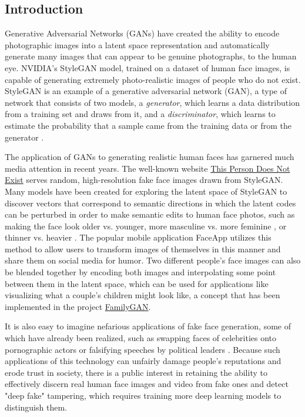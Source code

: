 \documentclass[11pt, letterpaper]{article}
\begin{document}
\begin{multicols}{2}
  \section{Introduction}

  Generative Adversarial Networks (GANs) have created the ability to encode
  photographic images into a latent space representation and automatically
  generate many images that can appear to be genuine photographs, to the human
  eye. NVIDIA's StyleGAN\cite{stylegan} model, trained on a dataset of human
  face images, is capable of generating extremely photo-realistic images of
  people who do not exist. StyleGAN is an example of a generative adversarial
  network (GAN), a type of network that consists of two models, a
  \emph{generator}, which learns a data distribution from a training set and
  draws from it, and a \emph{discriminator}, which learns to estimate the
  probability that a sample came from the training data or from the generator
  \cite{goodfellow2014generative}.

  The application of GANs to generating realistic human faces has garnered much
  media attention in recent years. The well-known website
  \href{https://thispersondoesnotexist.com/}{This Person Does Not Exist} serves
  random, high-resolution fake face images drawn from StyleGAN. Many models have
  been created for exploring the latent space of StyleGAN to discover vectors
  that correspond to semantic directions in which the latent codes can be
  perturbed in order to make semantic edits to human face photos, such as making
  the face look older vs. younger, more masculine vs. more feminine
  \cite{shen2020interpreting}, or thinner vs. heavier
  \cite{pinnimty2020transforming}. The popular mobile application FaceApp
  utilizes this method to allow users to transform images of themselves in this
  manner and share them on social media for humor. Two different people's face
  images can also be blended together by encoding both images and interpolating
  some point between them in the latent space, which can be used for applications
  like visualizing what a couple's children might look like, a concept that
  has been implemented in the project
  \href{https://medium.com/swlh/familygan-generating-a-childs-face-using-his-parents-394d8face6a4}{FamilyGAN}.

  It is also easy to imagine nefarious applications of fake face generation,
  some of which have already been realized, such as swapping faces of
  celebrities onto pornographic actors or falsifying speeches by political
  leaders \cite{nguyen2020deep}. Because such applications of this technology
  can unfairly damage people's reputations and erode trust in society, there is
  a public interest in retaining the ability to effectively discern real human
  face images and video from fake ones and detect "deep fake" tampering, which
  requires training more deep learning models to distinguish them.


\end{multicols}
\end{document}
